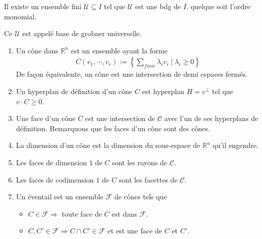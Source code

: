         \begin{coro}
            Il existe un ensemble fini $\mathcal{U} \subseteq I$ tel que $\mathcal{U}$ est une bdg de $I$, quelque soit l'ordre monomial.
        \end{coro}
        \begin{defi}
            Ce $\mathcal{U}$ est appelé base de grobner universelle.
        \end{defi}

        \begin{defi}
            \begin{enumerate}
                \item Un cône dans $\mathbb{R}^n$ est un ensemble ayant la forme
                \begin{align*}
                    C(v_1, \cdots, v_r) := \left\{ \sum_{finie} \lambda_i v_i \mid \lambda_i \geq 0 \right\}
                \end{align*}
                De façon équivalente, un cône est une intersection de demi espaces fermés.
                \item Un hyperplan de définition d'un cône $C$ est hyperplan $H = v^\bot$ tel que $v \cdot C \geq 0$.
                \item Une face d'un cône $C$ est une intersection de $\mathcal{C}$ avec l'un de ses hyperplans de définition. Remarquons que les faces d'un cône sont des cônes.
                \item La dimension d'un cône est la dimension du sous-espace de $\mathbb{R}^n$ qu'il engendre.
                \item Les faces de dimension $1$ de $C$ sont les rayons de $\mathcal{C}$.
                \item Les faces de codimension $1$ de $C$ sont les facettes de $\mathcal{C}$.
                \item Un éventail est un ensemble $\mathcal{F}$ de cônes tels que
                \begin{itemize}
                    \item $C \in \mathcal{F} \Rightarrow$ toute face de $C$ est dans $\mathcal{F}$.
                    \item $C,C' \in \mathcal{F} \Rightarrow C \cap C' \in \mathcal{F}$ et est une face de $C$ et $C'$.
                \end{itemize}
            \end{enumerate}
        \end{defi}

